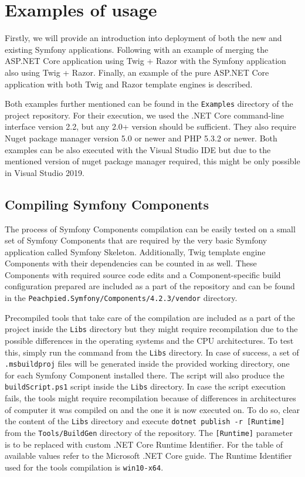 \chapter{Examples of usage}
Firstly, we will provide an introduction into deployment of both the new and existing Symfony applications. Following with an example of merging the ASP.NET Core application using Twig + Razor with the Symfony application also using Twig + Razor. Finally, an example of the pure ASP.NET Core application with both Twig and Razor template engines is described.

Both examples further mentioned can be found in the \texttt{Examples} directory of the project repository. For their execution, we used the .NET Core command-line interface version 2.2, but any 2.0+ version should be sufficient. They also require Nuget package manager version 5.0 or newer and PHP 5.3.2 or newer. Both examples can be also executed with the Visual Studio IDE but due to the mentioned version of nuget package manager required, this might be only possible in Visual Studio 2019.


\section{Compiling Symfony Components}
The process of Symfony Components compilation can be easily tested on a small set of Symfony Components that are required by the very basic Symfony application called Symfony Skeleton. Additionally, Twig template engine Components with their dependencies can be counted in as well. These Components with required source code edits and a Component-specific build configuration prepared are included as a part of the repository and can be found in the \texttt{Peachpied.Symfony/Components/4.2.3/vendor} directory.

Precompiled tools that take care of the compilation are included as a part of the project inside the \texttt{Libs} directory but they might require recompilation due to the possible differences in the operating systems and the CPU architectures. To test this, simply run the \noindent{} command from the \texttt{Libs} directory. In case of success, a set of \texttt{.msbuildproj} files will be generated inside the provided working directory, one for each Symfony Component installed there. The script will also produce the \texttt{buildScript.ps1} script inside the \texttt{Libs} directory. In case the script execution fails, the tools might require recompilation because of differences in architectures of computer it was compiled on and the one it is now executed on. To do so, clear the content of the \texttt{Libs} directory and execute \texttt{dotnet publish -r [Runtime]} from the \texttt{Tools/BuildGen} directory of the repository. The \texttt{[Runtime]} parameter is to be replaced with custom .NET Core Runtime Identifier. For the table of available values refer to the Microsoft .NET Core guide. The Runtime Identifier used for the tools compilation is \texttt{win10-x64}.

